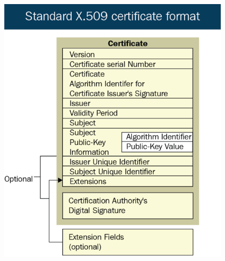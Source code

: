 \begin{figure}[ht]
        \centering
        \includegraphics[scale=0.35]{../IMAGES/x_509_standard.png}
        \label{x_509}
\end{figure}

